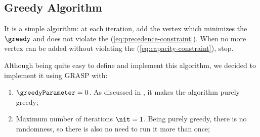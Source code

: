 \subsection{Greedy Algorithm}

It is a simple algorithm: at each iteration, add the vertex which minimizes the \greedyCriteriaText $\greedy$ and does not violate the \precedenceConstraint (\eqref{eq:precedence-constraint}). When no more vertex can be added without violating the \capacityConstraint (\eqref{eq:capacity-constraint}), stop.

Although being quite easy to define and implement this algorithm, we decided to implement it using GRASP with:

\begin{enumerate}
    \item \greedyParameterText $\greedyParameter = 0$. As discussed in , it makes the algorithm purely greedy;
    \item Maximum number of iterations $\nit = 1$. Being purely greedy, there is no randomness, so there is also no need to run it more than once;
\end{enumerate}

